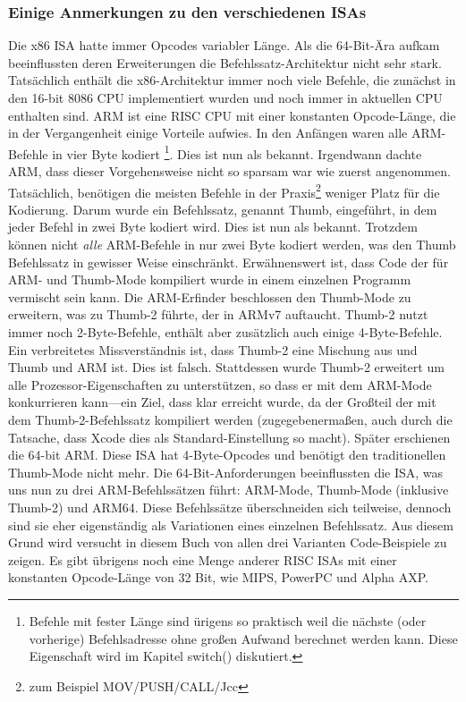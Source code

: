 %
%
%

\subsubsection{Einige Anmerkungen zu den verschiedenen \ac{ISA}s}
Die x86 \ac{ISA} hatte immer Opcodes variabler Länge. Als die 64-Bit-Ära aufkam beeinflussten deren Erweiterungen die Befehlssatz-Architektur
nicht sehr stark. Tatsächlich enthält die x86-Architektur immer noch viele Befehle, die zunächst in den 16-bit 8086 CPU implementiert
wurden und noch immer in aktuellen CPU enthalten sind.
ARM ist eine \ac{RISC} \ac{CPU} mit einer konstanten Opcode-Länge, die in der Vergangenheit einige Vorteile aufwies.
In den Anfängen waren alle ARM-Befehle in vier Byte kodiert%
\footnote{
Befehle mit fester Länge sind ürigens so praktisch weil die nächste (oder vorherige) 
Befehlsadresse ohne großen Aufwand berechnet werden kann. Diese Eigenschaft wird im Kapitel switch() diskutiert.}.
Dies ist nun als  bekannt.
Irgendwann dachte ARM, dass dieser Vorgehensweise nicht so sparsam war wie zuerst angenommen.
Tatsächlich, benötigen die meisten Befehle in der Praxis\footnote{zum Beispiel MOV/PUSH/CALL/Jcc} weniger Platz für die Kodierung.
Darum wurde ein Befehlssatz, genannt Thumb, eingeführt, in dem jeder Befehl in zwei Byte kodiert wird.
Dies ist nun als  bekannt.
Trotzdem können nicht \emph{alle} ARM-Befehle in nur zwei Byte kodiert werden, was den Thumb Befehlssatz in gewisser Weise einschränkt.
Erwähnenswert ist, dass Code der für ARM- und Thumb-Mode kompiliert wurde in einem einzelnen Programm vermischt sein kann.
Die ARM-Erfinder beschlossen den Thumb-Mode zu erweitern, was zu Thumb-2 führte, der in ARMv7 auftaucht.
Thumb-2 nutzt immer noch 2-Byte-Befehle, enthält aber zusätzlich auch einige 4-Byte-Befehle.
Ein verbreitetes Missverständnis ist, dass Thumb-2 eine Mischung aus und Thumb und ARM ist. Dies ist falsch.
Stattdessen wurde Thumb-2 erweitert um alle Prozessor-Eigenschaften zu unterstützen, so dass er mit dem ARM-Mode konkurrieren kann---ein
Ziel, dass klar erreicht wurde, da der Großteil der \idevices mit dem Thumb-2-Befehlssatz kompiliert werden (zugegebenermaßen, auch durch
die Tatsache, dass Xcode dies als Standard-Einstellung so macht).
Später erschienen die 64-bit ARM. Diese \ac{ISA} hat 4-Byte-Opcodes und benötigt den traditionellen Thumb-Mode nicht mehr.
Die 64-Bit-Anforderungen beeinflussten die \ac{ISA}, was uns nun zu drei ARM-Befehlssätzen führt: ARM-Mode, Thumb-Mode (inklusive Thumb-2) und ARM64.
Diese Befehlssätze überschneiden sich teilweise, dennoch sind sie eher eigenständig als Variationen eines einzelnen Befehlssatz.
Aus diesem Grund wird versucht in diesem Buch von allen drei Varianten Code-Beispiele zu zeigen.
%
%
%
Es gibt übrigens noch eine Menge anderer \ac{RISC} \ac{ISA}s mit einer konstanten Opcode-Länge von 32 Bit, wie MIPS, PowerPC und Alpha AXP.
